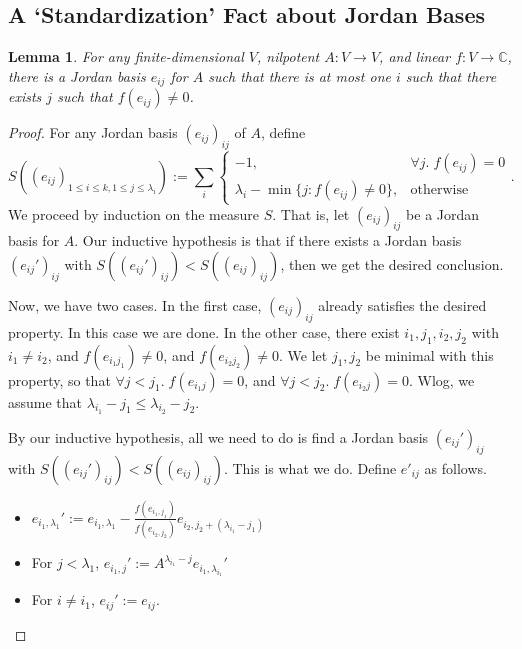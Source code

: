 \documentclass[12pt,psamsfonts]{article}
\newtheorem{lemma}[theorem]{Lemma}
\begin{document}
\subsection{A `Standardization' Fact about Jordan Bases}
\begin{lemma}\label{normalization_helper_one}
    For any finite-dimensional \(V\), nilpotent \(A : V \to V\), and linear \(f : V \to \mathbb{C}\), there is a Jordan basis \(e_{ij}\) for \(A\) such that there is at most one \(i\) such that there exists \(j\) such that \(f(e_{ij}) \neq 0\).
\end{lemma}
\begin{proof}
    For any Jordan basis \((e_{ij})_{ij}\) of \(A\), define
    \[S((e_{ij})_{1 \leq i \leq k, 1 \leq j \leq \lambda_i}) := \sum_i \begin{cases}-1, & \forall j. \; f (e_{ij}) = 0 \\ \lambda_i - \min\{j : f (e_{ij}) \neq 0\}, & \textrm{otherwise} \end{cases}.\]
    We proceed by induction on the measure \(S\).
    That is, let \((e_{ij})_{ij}\) be a Jordan basis for \(A\).
    Our inductive hypothesis is that if there exists a Jordan basis \((e_{ij}')_{ij}\) with \(S((e_{ij}')_{ij}) < S((e_{ij})_{ij})\), then we get the desired conclusion.
    \par Now, we have two cases.
    In the first case, \((e_{ij})_{ij}\) already satisfies the desired property.
    In this case we are done.
    In the other case, there exist \(i_1, j_1, i_2, j_2\) with \(i_1 \neq i_2\), and \(f(e_{i_1j_1}) \neq 0\), and \(f(e_{i_2j_2}) \neq 0\).
    We let \(j_1, j_2\) be minimal with this property, so that \(\forall j < j_1. \; f(e_{i_1j}) = 0\), and \(\forall j < j_2. \; f(e_{i_2j}) = 0\).
    Wlog, we assume that \(\lambda_{i_1} - j_1 \leq \lambda_{i_2} - j_2\).
    \par By our inductive hypothesis, all we need to do is find a Jordan basis \((e_{ij}')_{ij}\) with \(S((e_{ij}')_{ij}) < S((e_{ij})_{ij})\).
    This is what we do.
    Define \(e'_{ij}\) as follows.
    \begin{itemize}
        \item \(e_{i_1, \lambda_1}' := e_{i_1, \lambda_1} - \frac{f(e_{i_1, j_1})}{f(e_{i_2, j_2})}e_{i_2, j_2 + (\lambda_{i_1} - j_1)}\)
        \item For \(j < \lambda_1\), \(e_{i_1, j}' := A^{\lambda_{i_1} - j} e_{i_1, \lambda_{i_1}}'\)
        \item For \(i \neq i_1\), \(e_{ij}' := e_{ij}\).
    \end{itemize}

\end{proof}
\end{document}
